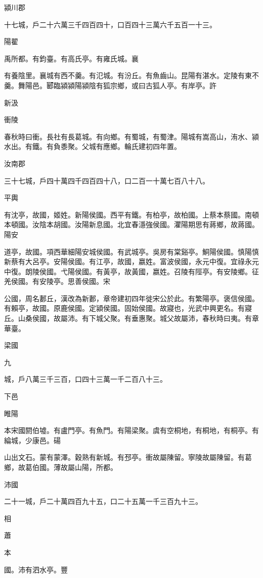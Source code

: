 
\begin{pinyinscope}
潁川郡

十七城，戶二十六萬三千四百四十，口百四十三萬六千五百一十三。

陽翟

禹所都。有鈞臺。有高氏亭。有雍氏城。襄

有養陰里。襄城有西不羹。有氾城。有汾丘。有魚齒山。昆陽有湛水。定陵有東不羹。舞陽邑。郾臨潁潁陽潁陰有狐宗鄉，或曰古狐人亭。有岸亭。許

新汲

衝陵

春秋時曰衝。長社有長葛城。有向鄉。有蜀城，有蜀津。陽城有嵩高山，洧水、潁水出。有鐵。有負黍聚。父城有應鄉。輪氏建初四年置。

汝南郡

三十七城，戶四十萬四千四百四十八，口二百一十萬七百八十八。

平輿

有沈亭，故國，姬姓。新陽侯國。西平有鐵。有柏亭，故柏國。上蔡本蔡國。南頓本頓國。汝陰本胡國。汝陽新息國。北宜春濦強侯國。灈陽期思有蔣鄉，故蔣國。陽安

道亭，故國。項西華細陽安城侯國。有武城亭。吳房有棠谿亭。鮦陽侯國。慎陽慎新蔡有大呂亭。安陽侯國。有江亭，故國，嬴姓。富波侯國，永元中復。宜祿永元中復。朗陵侯國。弋陽侯國。有黃亭，故黃國，嬴姓。召陵有陘亭。有安陵鄉。征羌侯國。有安陵亭。思善侯國。宋

公國，周名郪丘，漢改為新郪，章帝建初四年徙宋公於此。有繁陽亭。褒信侯國。有賴亭，故國。原鹿侯國。定潁侯國。固始侯國。故寢也，光武中興更名。有寢丘。山桑侯國，故屬沛。有下城父聚。有垂惠聚。城父故屬沛，春秋時曰夷。有章華臺。

梁國

九

城，戶八萬三千三百，口四十三萬一千二百八十三。

下邑

睢陽

本宋國閼伯墟。有盧門亭。有魚門。有陽梁聚。虞有空桐地，有桐地，有桐亭。有綸城，少康邑。碭

山出文石。蒙有蒙澤。穀熟有新城。有邳亭。衝故屬陳留。寧陵故屬陳留。有葛鄉，故葛伯國。薄故屬山陽，所都。

沛國

二十一城，戶二十萬四百九十五，口二十五萬一千三百九十三。

相

蕭

本

國。沛有泗水亭。豐


\end{pinyinscope}
